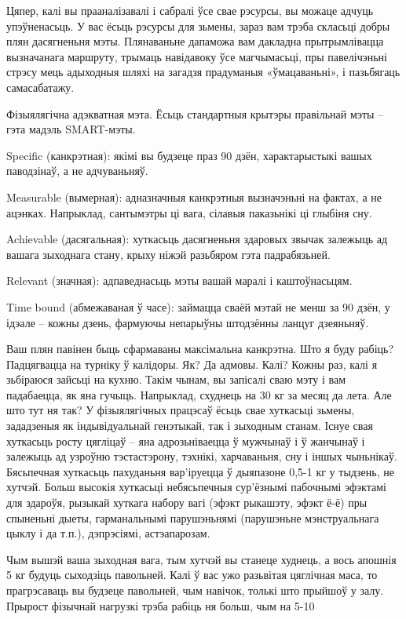 Цяпер, калі вы прааналізавалі і сабралі ўсе свае рэсурсы, вы можаце адчуць упэўненасьць. У вас ёсьць рэсурсы для зьмены, зараз вам трэба скласьці добры плян дасягненьня мэты. Плянаваньне дапаможа вам дакладна прытрымлівацца вызначанага маршруту, трымаць навідавоку ўсе магчымасьці, пры павелічэньні стрэсу мець адыходныя шляхі на загадзя прадуманыя «ўмацаваньні», і пазьбягаць самасабатажу.

Фізыялягічна адэкватная мэта. Ёсьць стандартныя крытэры правільнай мэты – гэта мадэль SMART-мэты. 

Specific (канкрэтная): якімі вы будзеце праз 90 дзён, характарыстыкі вашых паводзінаў, а не адчуваньняў. 

Measurable (вымерная): адназначныя канкрэтныя вызначэньні на фактах, а не ацэнках. Напрыклад, сантымэтры ці вага, сілавыя паказьнікі ці глыбіня сну. 

Achievable (дасягальная): хуткасьць дасягненьня здаровых звычак залежыць ад вашага зыходнага стану, крыху ніжэй разьбяром гэта падрабязьней. 

Relevant (значная): адпаведнасьць мэты вашай маралі і каштоўнасьцям. 

Time bound (абмежаваная ў часе): займацца сваёй мэтай не менш за 90 дзён, у ідэале – кожны дзень, фармуючы непарыўны штодзённы ланцуг дзеяньняў. 

Ваш плян павінен быць сфармаваны максімальна канкрэтна. Што я буду рабіць? Падцягвацца на турніку ў калідоры. Як? Да адмовы. Калі? Кожны раз, калі я зьбіраюся зайсьці на кухню. Такім чынам, вы запісалі сваю мэту і вам падабаецца, як яна гучыць. Напрыклад, схуднець на 30 кг за месяц да лета. Але што тут ня так? У фізыялягічных працэсаў ёсьць свае хуткасьці зьмены, зададзеныя як індывідуальнай генэтыкай, так і зыходным станам. Існуе свая хуткасьць росту цягліцаў – яна адрозьніваецца ў мужчынаў і ў жанчынаў і залежыць ад узроўню тэстастэрону, тэхнікі, харчаваньня, сну і іншых чыньнікаў. Бясьпечная хуткасьць пахуданьня вар'іруецца ў дыяпазоне 0,5-1 кг у тыдзень, не хутчэй. Больш высокія хуткасьці небясьпечныя сур'ёзнымі пабочнымі эфэктамі для здароўя, рызыкай хуткага набору вагі (эфэкт рыкашэту, эфэкт ё-ё) пры спыненьні дыеты, гарманальнымі парушэньнямі (парушэньне мэнструальнага цыклу і да т.п.), дэпрэсіямі, астэапарозам. 

Чым вышэй ваша зыходная вага, тым хутчэй вы станеце худнець, а вось апошнія 5 кг будуць сыходзіць павольней. Калі ў вас ужо разьвітая цяглічная маса, то прагрэсаваць вы будзеце павольней, чым навічок, толькі што прыйшоў у залу. Прырост фізычнай нагрузкі трэба рабіць ня больш, чым на 5-10%

